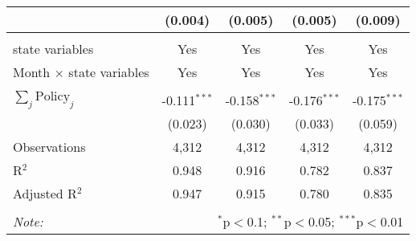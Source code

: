 \begin{tabular}{@{\extracolsep{1pt}}lcccc}
  & (0.004) & (0.005) & (0.005) & (0.009) \\ 
 \hline \\[-1.8ex] 
state variables & Yes & Yes & Yes & Yes \\ 
Month $\times$ state variables & Yes & Yes & Yes & Yes \\ 
\hline \\[-1.8ex] 
$\sum_j \mathrm{Policy}_j$ & -0.111$^{***}$ & -0.158$^{***}$ & -0.176$^{***}$ & -0.175$^{***}$ \\ 
 & (0.023) & (0.030) & (0.033) & (0.059) \\ 
Observations & 4,312 & 4,312 & 4,312 & 4,312 \\ 
R$^{2}$ & 0.948 & 0.916 & 0.782 & 0.837 \\ 
Adjusted R$^{2}$ & 0.947 & 0.915 & 0.780 & 0.835 \\ 
\hline 
\hline \\[-1.8ex] 
\textit{Note:}  & \multicolumn{4}{r}{$^{*}$p$<$0.1; $^{**}$p$<$0.05; $^{***}$p$<$0.01} \\ 
\end{tabular} 